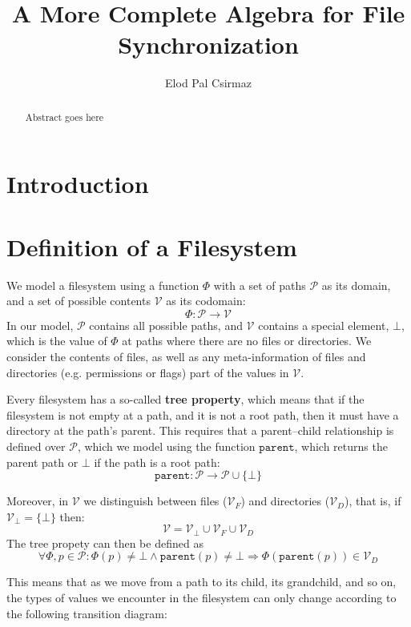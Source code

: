\documentclass[12pt]{article}
\title{A More Complete Algebra for File Synchronization}
\author{Elod Pal Csirmaz}
\newcommand{\setv}{\mathcal{V}}
\newcommand{\setvx}[1]{\mathcal{V}_{#1}}
\newcommand{\setf}{\setvx{F}}
\newcommand{\setd}{\setvx{D}}
\newcommand{\setb}{\setvx{\empt}}
\newcommand{\setp}{\mathcal{P}}
\newcommand{\empt}{\bot}
\newcommand{\parent}{\mathtt{parent}}
\newcommand{\FS}{\Phi} %
\theoremstyle{definition}
\begin{document}
\maketitle
\begin{abstract}
Abstract goes here
\end{abstract}

\section{Introduction}


\section{Definition of a Filesystem}

We model a filesystem using a function $\FS$ with a set of paths $\setp$ as its domain,
and a set of possible contents $\setv$ as its codomain:
\[ \FS : \setp \rightarrow \setv \] 
In our model, $\setp$ contains all possible paths, and $\setv$ contains a special
element, $\empt$, which is the value of $\FS$ at paths where there are no files
or directories.
We consider the contents of files, as well as any meta-information of files
and directories (e.g. permissions or flags) part of the values in $\setv$.

Every filesystem has a so-called \textbf{tree property}, which means that
if the filesystem is not empty at a path, and it is not a root path,
then it must have a directory at the path's parent.
This requires that a parent--child relationship is defined over $\setp$,
which we model using the function $\parent$, which returns the parent path
or $\empt$ if the path is a root path:
\[ \parent : \setp \rightarrow \setp \cup \{\empt\} \]

Moreover, in $\setv$ we distinguish between files ($\setf$) and directories ($\setd$), that is,
if $\setb = \{\empt\}$ then:
\[ \setv = \setb \cup \setf \cup \setd \]
The tree propety can then be defined as
\[ \forall \FS, p\in\setp : \FS(p) \neq \empt \wedge \parent(p) \neq \empt \Rightarrow \FS(\parent(p)) \in \setd \]

This means that as we move from a path to its child, its grandchild, and so on,
the types of values we encounter in the filesystem can only change according to the following
transition diagram:
\end{document}
